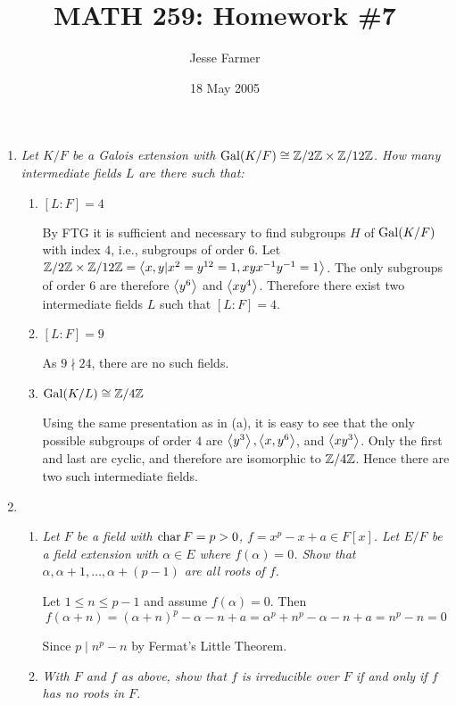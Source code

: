 \documentclass[10pt]{article}
\title{MATH 259: Homework \#7}
\author{Jesse Farmer}
\date{18 May 2005}
\begin{document}
\maketitle
\begin{enumerate}

\item \emph{Let $K/F$ be a Galois extension with $\operatorname{Gal}(K/F) \cong \mathbb{Z}/2\mathbb{Z} \times \mathbb{Z}/12\mathbb{Z}$.  How many intermediate fields $L$ are there such that:}
\begin{enumerate}
\item \emph{$[L:F] = 4$}

By FTG it is sufficient and necessary to find subgroups $H$ of $\operatorname{Gal}(K/F)$ with index $4$, i.e., subgroups of order $6$.  Let $\mathbb{Z}/2\mathbb{Z} \times \mathbb{Z}/12\mathbb{Z} = \left\langle x, y | x^2 = y^{12} = 1, xyx^{-1}y^{-1} = 1 \right\rangle$.  The only subgroups of order $6$ are therefore $\left\langle y^6 \right\rangle$ and $\left\langle xy^4 \right\rangle$.  Therefore there exist two intermediate fields $L$ such that $[L:F] = 4$.
\item \emph{$[L:F] = 9$}

As $9 \nmid 24$, there are no such fields.

\item \emph{$\operatorname{Gal}(K/L) \cong \mathbb{Z}/4\mathbb{Z}$}

Using the same presentation as in (a), it is easy to see that the only possible subgroups of order $4$ are $\left\langle y^3 \right\rangle, \left\langle x, y^6 \right\rangle$, and $\left\langle xy^3 \right\rangle$.  Only the first and last are cyclic, and therefore are isomorphic to $\mathbb{Z}/4\mathbb{Z}$.  Hence there are two such intermediate fields.

\end{enumerate}

\item
\begin{enumerate}
\item \emph{Let $F$ be a field with $\operatorname{char} F = p > 0$, $f = x^p - x + a \in F[x]$.  Let $E/F$ be a field extension with $\alpha \in E$ where $f(\alpha) = 0$.  Show that $\alpha, \alpha+1, \ldots, \alpha+(p-1)$ are all roots of $f$.}

Let $1 \leq n \leq p -1$ and assume $f(\alpha) = 0$.  Then
\[
f(\alpha + n) = (\alpha + n)^p - \alpha - n + a = \alpha^p + n^p - \alpha - n + a = n^p - n = 0
\]

Since $p \mid n^p - n$ by Fermat's Little Theorem.

\item \emph{With $F$ and $f$ as above, show that $f$ is irreducible over $F$ if and only if $f$ has no roots in $F$.}


\end{enumerate}
\end{enumerate}
\end{document}
